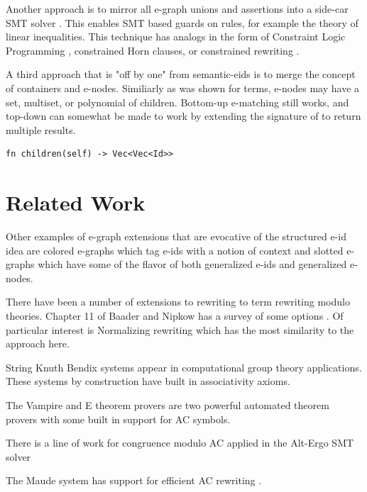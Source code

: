 \documentclass[sigconf]{acmart}
\begin{document}
Another approach is to mirror all e-graph unions and assertions into a side-car SMT solver \cite{extz3egraph}. This enables SMT based guards on rules, for example the theory of linear inequalities. This technique has analogs in the form of Constraint Logic Programming \cite{JAFFAR1994503}, constrained Horn clauses, or constrained rewriting  \cite{constrainedrewrite}.

A third approach that is "off by one" from semantic-eids is to merge the concept of containers and e-nodes. Similiarly as was shown for terms, e-nodes may have a set, multiset, or polynomial of children. Bottom-up e-matching still works, and top-down can somewhat be made to work by extending the signature of to return multiple results.

\begin{lstlisting}
fn children(self) -> Vec<Vec<Id>>
\end{lstlisting}

\section{Related Work}

Other examples of e-graph extensions that are evocative of the structured e-id idea are colored e-graphs \cite{singher2023colored} which tag e-ids with a notion of context and slotted e-graphs \cite{slotted} which have some of the flavor of both generalized e-ids and generalized e-nodes. 

There have been a number of extensions to rewriting to term rewriting modulo theories. Chapter 11 of Baader and Nipkow has a survey of some options \cite{traatbook}. Of particular interest is Normalizing rewriting \cite{MARCHE1996253} which has the most similarity to the approach here.

String Knuth Bendix systems appear in computational group theory applications. These systems by construction have built in associativity axioms.

The Vampire \cite{vampire} and E theorem provers \cite{eprover} are two powerful automated theorem provers with some built in support for AC symbols.

There is a line of work for congruence modulo AC applied in the Alt-Ergo SMT solver \cite{conchon12lmcs}

The Maude system has support for efficient AC rewriting \cite{maudeac}.

\end{document}
